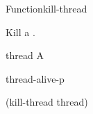 \documentclass[10pt,twoside,english,pdftex]{article}
\begin{document}

\begin{functiondoc}{Function}{kill-thread}{}
%
%

\fnsyntax

\fnpurpose Kill a .

\fnpackage {}

\fnmodule {}

\fnargs
\begin{args}{thread}
\arg[thread] A 
\end{args}

\fnerrors
\nothreads{}

\begin{alsos}{thread-alive-p}
\end{alsos}

\fnexample
%
\W\supp
\begin{example}
  (kill-thread thread)
\end{example}

\end{functiondoc}

\end{document}
